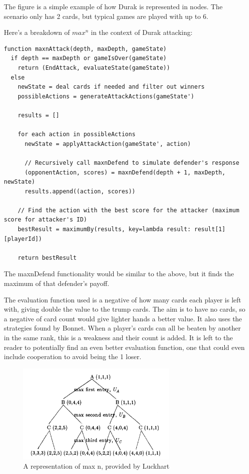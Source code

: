 \documentclass[a4paper, twoside, 12pt]{report}
\begin{document}
The figure is a simple example of how Durak is represented in nodes. The scenario only has 2 cards, but typical games are played with up to 6.

Here's a breakdown of \(max^n\) in the context of Durak attacking:

\begin{lstlisting}
function maxnAttack(depth, maxDepth, gameState)
  if depth == maxDepth or gameIsOver(gameState)
    return (EndAttack, evaluateState(gameState))
  else
    newState = deal cards if needed and filter out winners
    possibleActions = generateAttackActions(gameState')
    
    results = []
    
    for each action in possibleActions
      newState = applyAttackAction(gameState', action)
      
      // Recursively call maxnDefend to simulate defender's response
      (opponentAction, scores) = maxnDefend(depth + 1, maxDepth, newState)
      results.append((action, scores))
    
    // Find the action with the best score for the attacker (maximum score for attacker's ID)
    bestResult = maximumBy(results, key=lambda result: result[1][playerId])

    return bestResult
\end{lstlisting}

The maxnDefend functionality would be similar to the above, but it finds the maximum of that defender's payoff.


The evaluation function used is a negative of how many cards each player is left with, giving double the value to the trump cards. The aim is to have no cards, so a negative of card count would give lighter hands a better value. It also uses the strategies found by Bonnet\cite{bonnet}. When a player's cards can all be beaten by another in the same rank, this is a weakness and their count is added. It is left to the reader to potentially find an even better evaluation function, one that could even include cooperation to avoid being the 1 loser.

\begin{figure}[h]
	\centering
	\includegraphics[width=8cm]{maxn.png}
	\caption{A representation of max n, provided by Luckhart\cite{luckhart}}
	\label{fig:maxn}
\end{figure}
\end{document}
